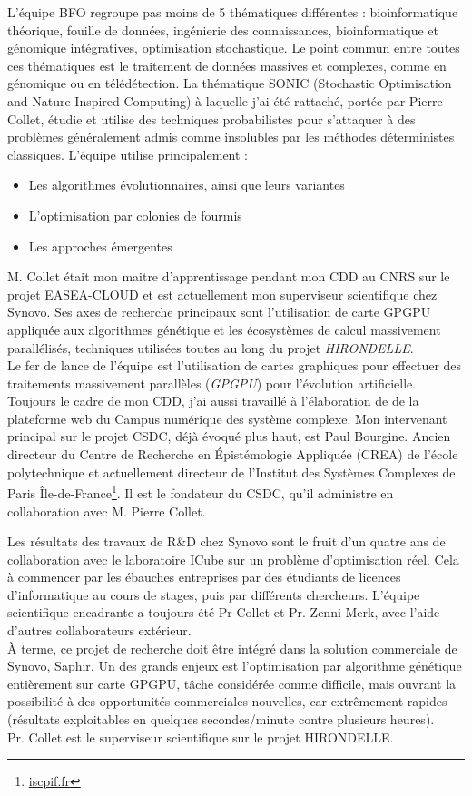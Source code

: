\documentclass[french, 11pt]{memoir}
\begin{document}
L'équipe BFO regroupe pas moins de 5 thématiques différentes :
bioinformatique théorique, fouille de données, ingénierie des
connaissances, bioinformatique et génomique intégratives, optimisation
stochastique. Le point commun entre toutes ces thématiques est le
traitement de données massives et complexes, comme en génomique ou en
télédétection. La thématique SONIC (Stochastic Optimisation and Nature
Inspired Computing) à laquelle j'ai été rattaché, portée par Pierre
Collet, étudie et utilise des techniques probabilistes pour s'attaquer à
des problèmes généralement admis comme insolubles par les méthodes
déterministes classiques. L'équipe utilise principalement :

\begin{itemize}
\item
  Les algorithmes évolutionnaires, ainsi que leurs variantes
\item
  L'optimisation par colonies de fourmis
\item
  Les approches émergentes
\end{itemize}

\bigskip
M. Collet était mon maitre d'apprentissage pendant mon CDD au CNRS sur
le projet EASEA-CLOUD et est actuellement mon superviseur scientifique
chez Synovo. Ses axes de recherche principaux sont l'utilisation de
carte GPGPU appliquée aux algorithmes génétique et les écosystèmes de
calcul massivement parallélisés, techniques utilisées toutes au long du
projet \textit{HIRONDELLE}. \\
Le fer de lance de l'équipe est l'utilisation de cartes graphiques pour
effectuer des traitements massivement parallèles (\textit{GPGPU}) pour
l'évolution artificielle. \\
Toujours le cadre de mon CDD, j'ai aussi travaillé à l'élaboration de de
la plateforme web du Campus numérique des système complexe. Mon intervenant principal sur 
le projet CSDC, déjà évoqué plus haut, est Paul Bourgine. Ancien directeur du Centre de Recherche en Épistémologie Appliquée
(CREA) de l'école polytechnique et actuellement directeur de l'Institut
des Systèmes Complexes de Paris Île-de-France\footnote{\url{iscpif.fr}}. Il est le fondateur du
CSDC, qu'il administre en collaboration avec M. Pierre Collet.

\bigskip
Les
résultats des travaux de R\&D chez Synovo sont le fruit d'un quatre ans
de collaboration avec le laboratoire ICube sur un problème
d'optimisation réel. Cela à commencer par les ébauches entreprises par
des étudiants de licences d'informatique au cours de stages, puis par
différents chercheurs. L'équipe scientifique encadrante a toujours été
Pr Collet et Pr. Zenni-Merk, avec l'aide d'autres collaborateurs
extérieur. \\
À terme, ce projet de recherche doit être intégré dans la solution
commerciale de Synovo, Saphir. Un des grands enjeux est l'optimisation
par algorithme génétique entièrement sur carte GPGPU, tâche considérée
comme difficile, mais ouvrant la possibilité à des opportunités
commerciales nouvelles, car extrêmement rapides (résultats exploitables
en quelques secondes/minute contre plusieurs heures). \\
Pr. Collet est le superviseur scientifique sur le projet HIRONDELLE.
\end{document}
